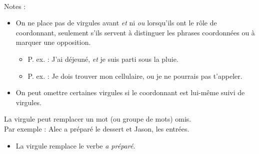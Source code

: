 \documentclass[10pt, french]{article}
\begin{document}
\begin{multicols*}{2}
\begin{definitionNOHFILL}[La virgule]
\begin{definitionNOHFILLpropos}[La coordination]
\

Notes : 
\begin{itemize}
	\item	On ne place pas de virgules avant \textit{et} ni \textit{ou} lorsqu'ils ont le rôle de coordonnant, seulement s'ils servent à distinguer les phrases coordonnées ou à marquer une opposition.
		\begin{itemize}
		\item	P. ex. : J'ai déjeuné, \textit{et} je suis parti sous la pluie.
		\item	P. ex. : Je dois trouver mon cellulaire, ou je ne pourrais pas t'appeler.
		\end{itemize}
	\item	On peut omettre certaines virgules si le coordonnant est lui-même suivi de virgules.
\end{itemize}

\end{definitionNOHFILLpropos}
\begin{definitionNOHFILLpropos}[L'effacement]
La virgule peut remplacer un mot (ou groupe de mots) omis.	\\

Par exemple : Alec a préparé le dessert et Jason, les entrées.
\begin{itemize}
	\item	La virgule remplace le verbe \textit{a préparé}.
\end{itemize}
\end{definitionNOHFILLpropos}
\end{definitionNOHFILL}


\end{multicols*}
\end{document}
